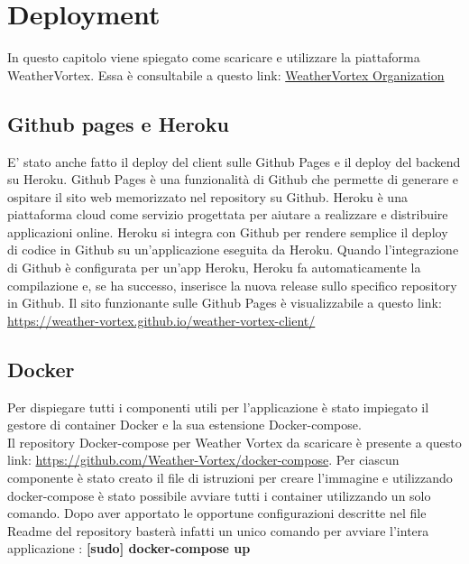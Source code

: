 

\chapter{Deployment}
In questo capitolo viene spiegato come scaricare e utilizzare la piattaforma
WeatherVortex. Essa è consultabile a questo link: \href{https://github.com/Weather-Vortex}{WeatherVortex Organization}
\section{Github pages e Heroku}
E' stato anche fatto il deploy del client sulle Github Pages e il deploy del backend su Heroku. Github Pages è una funzionalità di Github che permette di generare e ospitare il sito web memorizzato nel repository su Github. Heroku è una piattaforma cloud come servizio progettata per aiutare a realizzare e distribuire applicazioni online. Heroku si integra con Github per rendere semplice il deploy di codice in Github su un'applicazione eseguita da Heroku. Quando l'integrazione di Github è configurata per un'app Heroku, Heroku fa automaticamente la compilazione e, se ha successo, inserisce la nuova release sullo specifico repository in Github. 
Il sito funzionante sulle Github Pages è visualizzabile a questo link: \href{https://weather-vortex.github.io/weather-vortex-client/#/}{https://weather-vortex.github.io/weather-vortex-client/}


\section{Docker}
Per dispiegare tutti i componenti utili per l’applicazione è stato impiegato il
gestore di container Docker e la sua estensione Docker-compose.\\
Il repository Docker-compose per Weather Vortex da scaricare è presente a questo link:
\href{https://github.com/Weather-Vortex/docker-compose}{https://github.com/Weather-Vortex/docker-compose}.
Per ciascun componente è stato creato il file di istruzioni per creare l’immagine e utilizzando docker-compose è stato possibile avviare tutti i container utilizzando un solo comando.
Dopo aver apportato le opportune configurazioni descritte nel file Readme del repository basterà infatti un unico comando per avviare l'intera applicazione : \textbf{[sudo] docker-compose up}

